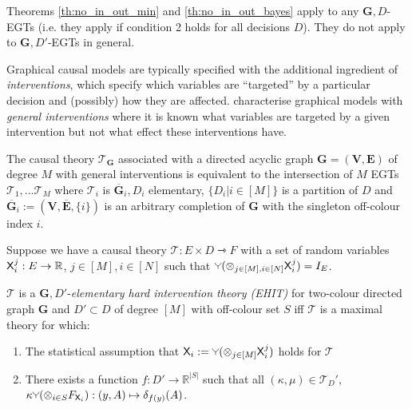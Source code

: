 Theorems \ref{th:no_in_out_min} and \ref{th:no_in_out_bayes} apply to any $\mathbf{G},D$-EGTs (i.e. they apply if condition 2 holds for all decisions $D$). They do not apply to $\mathbf{G},D'$-EGTs in general.

Graphical causal models are typically specified with the additional ingredient of \emph{interventions}, which specify which variables are ``targeted'' by a particular decision and (possibly) how they are affected.  \citet{yang_characterizing_2018} characterise graphical models with \emph{general interventions} where it is known what variables are targeted by a given intervention but not what effect these interventions have.

\begin{proposition}
The causal theory $\mathscr{T}_{\mathbf{G}}$ associated with a directed acyclic graph $\mathbf{G}=(\mathbf{V},\mathbf{E})$ of degree $M$ with general interventions is equivalent to the intersection of $M$ EGTs $\mathscr{T}_1,...\mathscr{T}_M$ where $\mathscr{T}_i$ is $\overline{\mathbf{G}}_i,D_i$ elementary, $\{D_i|i\in [M]\}$ is a partition of $D$ and $\overline{\mathbf{G}}_i:=(\mathbf{V},\overline{\mathbf{E}},\{i\})$ is an arbitrary completion of $\mathbf{G}$ with the singleton off-colour index $i$.
\end{proposition}


\begin{definition}
Suppose we have a causal theory $\mathscr{T}: E\times D\rightarrowtriangle F$ with a set of random variables $\mathsf{X}^j_i:E\to \mathbb{R}$, $j\in [M],i\in [N]$ such that $\splitter{0.1}(\otimes_{j\in [M],i\in[N]} \RV{X}^j_i)=I_E$.

$\mathscr{T}$ is a $\mathbf{G},D'$-\emph{elementary hard intervention theory (EHIT)} for two-colour directed graph $\mathbf{G}$ and $D'\subset D$ of degree $[M]$ with off-colour set $S$ iff $\mathscr{T}$ is a maximal theory for which:
\begin{enumerate}
    \item The statistical assumption that $\RV{X}_i:= \splitter{0.1}(\otimes_{j\in [M]} \RV{X}^j_i)$ holds for $\mathscr{T}$
    \item There exists a function $f:D'\to \mathbb{R}^|S|$ such that all $(\kappa,\mu)\in\mathscr{T}_D'$, $\kappa \splitter{0.1}(\otimes_{i\in S} F_{\RV{X}_i}):(y,A)\mapsto \delta_{f(y)}(A)$.
\end{enumerate}
\end{definition}

